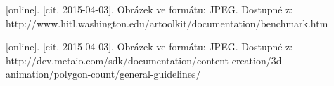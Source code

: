 \documentclass[twoside,12pt]{article}
\begin{document}
\begin{literatura}
{
	[online]. [cit. 2015-04-03]. 
	Obrázek ve formátu: JPEG. Dostupné z: http://www.hitl.washington.edu/artoolkit/documentation/benchmark.htm
}

{
	[online]. [cit. 2015-04-03]. 
	Obrázek ve formátu: JPEG. Dostupné z: http://dev.metaio.com/sdk/documentation/content-creation/3d-animation/polygon-count/general-guidelines/
}





%




\end{literatura}
\end{document}
